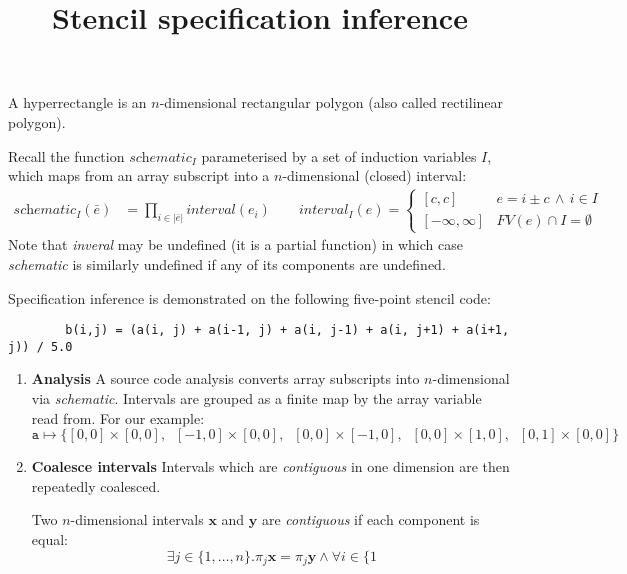 \documentclass[acmlarge,review]{acmart}
\title{Stencil specification inference}
\newcommand{\vect}[1]{\textbf{#1}}
\begin{document}
\maketitle

\begin{definition}
A hyperrectangle is an $n$-dimensional rectangular polygon (also
called rectilinear polygon).
\end{definition}

\noindent
Recall the function $\textit{schematic}_I$ parameterised by
a set of induction variables $I$, which maps
from an array subscript into a $n$-dimensional (closed) interval:
%
\begin{align*}
\textit{schematic}_I(\bar{e}) & =
\prod_{i \in |\bar{e}|} \textit{interval}(e_i)
\qquad
\textit{interval}_I(e) = \begin{cases}
[c, c] & e = i \pm c \, \wedge \, i \in I \\
[-\infty, \infty] & FV(e) \cap I = \emptyset
\end{cases}
\end{align*}
Note that \textit{inveral} may be undefined (it is a partial function)
in which case \textit{schematic} is similarly undefined if any of its
components are undefined.

\noindent
Specification inference is demonstrated on the following five-point
stencil code:
%
\begin{center}
\begin{verbatim}
        b(i,j) = (a(i, j) + a(i-1, j) + a(i, j-1) + a(i, j+1) + a(i+1, j)) / 5.0
\end{verbatim}
\end{center}
%

\begin{enumerate}[leftmargin=1.5em]
\item \textbf{Analysis} A source code analysis converts array subscripts into
  $n$-dimensional via \textit{schematic}. Intervals are grouped as a
  finite map  by the array variable read from. For our example:
%
\begin{equation*}
\texttt{a} \mapsto \{[0,0]\times[0,0], \;\; [-1,0]\times[0,0], \;\;
[0,0]\times[-1,0], \;\; [0,0]\times[1,0], \;\; [0,1]\times[0,0]\}
\end{equation*}
%


\item \textbf{Coalesce intervals}
Intervals which are \emph{contiguous} in one dimension are then
repeatedly coalesced.

\begin{definition}
Two $n$-dimensional intervals $\vect{x}$ and $\vect{y}$ are
\emph{contiguous} if each component is equal:
%
\begin{equation*}
\exists j \in \{1, \ldots, n\} . \pi_j \vect{x} = \pi_j \vect{y}
\wedge \forall i \in \{1
\end{equation*}
%
\end{definition}

\end{enumerate}
\end{document}
